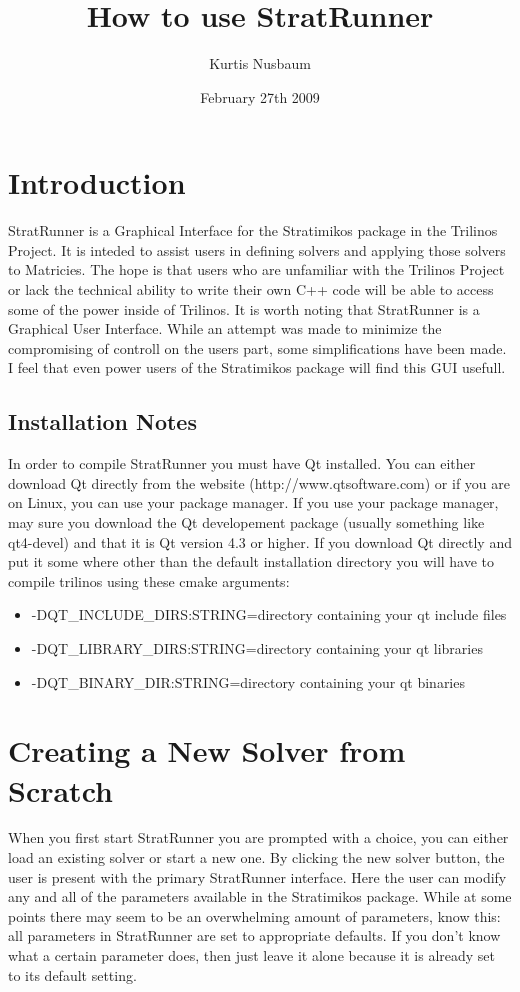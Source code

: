\documentclass{article}
\title{How to use StratRunner}
\author{Kurtis Nusbaum}
\date{February 27th 2009}
\begin{document}
\maketitle

\section{Introduction}
StratRunner is a Graphical Interface for the Stratimikos package in the Trilinos Project. It is inteded to assist users in defining solvers
and applying those solvers to Matricies. The hope is that users who are unfamiliar with the Trilinos Project or lack the technical ability
to write their own C++ code will be able to access some of the power inside of Trilinos. It is worth noting that StratRunner is a Graphical User
Interface. While an attempt was made to minimize the compromising of controll on the users part, some simplifications have been made. I feel that even
power users of the Stratimikos package will find this GUI usefull.
\subsection{Installation Notes}
In order to compile StratRunner you must have Qt installed. You can either download Qt directly from the website (http://www.qtsoftware.com) or if you are on Linux, you can use your package manager.
If you use your package manager, may sure you download the Qt developement package (usually something like qt4-devel) and that it is Qt version 4.3 or higher. If you download Qt directly and put it some where other than the default
	installation directory you will have to compile trilinos using these cmake arguments:
	\begin{itemize}
	\item -DQT\_INCLUDE\_DIRS:STRING=directory containing your qt include files
	\item -DQT\_LIBRARY\_DIRS:STRING=directory containing your qt libraries
	\item -DQT\_BINARY\_DIR:STRING=directory containing your qt binaries
	\end{itemize}	
\section{Creating a New Solver from Scratch}

When you first start StratRunner you are prompted with a choice, you can either load an existing solver or start a new one. By clicking the new solver
button, the user is present with the primary StratRunner interface. Here the user can modify any and all of the parameters available in the Stratimikos
package. While at some points there may seem to be an overwhelming amount of parameters, know this: all parameters in StratRunner are set to appropriate 
defaults. If you don't know what a certain parameter does, then just leave it alone because it is already set to its default setting.
\end{document}
